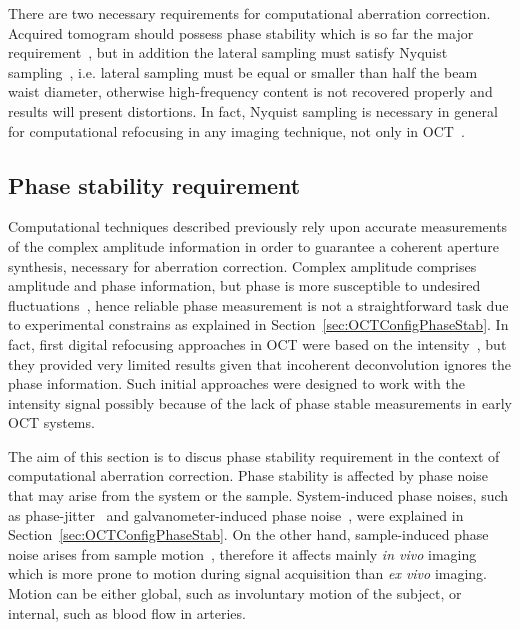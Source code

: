 There are two necessary requirements for computational aberration correction. Acquired tomogram should possess phase stability which is so far the major requirement~\cite{Shemonski2014_Stability, Liu2017_Computational, South2016_Computed}, but in addition the lateral sampling must satisfy Nyquist sampling~\cite{Liu2017_Computational}, i.e. lateral sampling must be equal or smaller than half the beam waist diameter, otherwise high-frequency content is not recovered properly and results will present distortions. In fact, Nyquist sampling is necessary in general for computational refocusing in any imaging technique, not only in OCT~\cite{Wallace2001_Workingpersons, Pawley2006_Handbook, Biggs2010_3D}. 

\FloatBarrier

\subsection{Phase stability requirement} \label{sec:phaseStab}

Computational techniques described previously rely upon accurate measurements of the complex amplitude information in order to guarantee a coherent aperture synthesis, necessary for aberration correction. Complex amplitude comprises amplitude and phase information, but phase is more susceptible to undesired fluctuations~\cite{Vakoc2005_Phaseresolved}, hence reliable phase measurement is not a straightforward task due to experimental constrains as explained in Section~\ref{sec:OCTConfigPhaseStab}. In fact, first digital refocusing approaches in OCT were based on the intensity~\cite{Ralston2005_Deconvolution, Woolliams2010_Spatially, Liu2009_Deconvolution}, but they provided very limited results given that incoherent deconvolution ignores the phase information. Such initial approaches were designed to work with the intensity signal possibly because of the lack of phase stable measurements in early OCT systems.

The aim of this section is to discus phase stability requirement in the context of computational aberration correction. Phase stability is affected by phase noise that may arise from the system or the sample. System-induced phase noises, such as phase-jitter~\cite{Vakoc2005_Phaseresolved} and galvanometer-induced phase noise~\cite{Adie2015_Interferometric, White2003_vivo}, were explained in Section~\ref{sec:OCTConfigPhaseStab}. On the other hand, sample-induced phase noise arises from sample motion~\cite{Shemonski2014_Stability-1}, therefore it affects mainly \textit{in vivo} imaging which is more prone to motion during signal acquisition than \textit{ex vivo} imaging. Motion can be either global, such as involuntary motion of the subject, or internal, such as blood flow in arteries.

